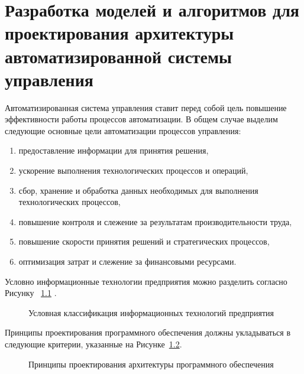 \chapter{Разработка моделей и алгоритмов для проектирования архитектуры автоматизированной системы управления}\label{ch:ch2}
Автоматизированная система управления ставит перед собой цель повышение эффективности работы процессов автоматизации. В общем случае выделим следующие основные цели автоматизации процессов управления:
\begin{enumerate}
	\item предоставление информации для принятия решения, 
	\item ускорение выполнения технологических процессов и операций, 
	\item сбор, хранение и обработка данных необходимых для выполнения технологических процессов,
	\item повышение контроля и слежение за результатам производительности труда,
	\item повышение скорости принятия решений и стратегических процессов,
	\item оптимизация затрат и слежение за финансовыми ресурсами.
\end{enumerate} 

Условно информационные технологии предприятия можно разделить согласно Рисунку ~\cref{fig:ITclass} \cite{ITclass}.

\begin{figure}[ht1]
    \caption{Условная классификация информационных технологий предприятия}\label{fig:ITclass}
\end{figure}

Принципы проектирования программного обеспечения должны укладываться в следующие критерии, указанные на Рисунке~\cref{fig:principles}.  

\begin{figure}[ht]
    \caption{Принципы проектирования архитектуры программного обеспечения}\label{fig:principles}
\end{figure}

